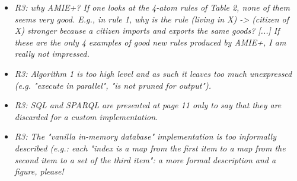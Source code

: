 \begin{figure*}[t!]
\hspace{.1\textwidth}
\begin{minipage}{.8\textwidth}
\large 
     \begin{itemize}
     
      \item \textit{R3: why AMIE+? If one looks at the 4-atom rules of Table 2, none of them seems very good. 
      E.g., in rule 1, why is the rule (living in X) -> (citizen of X) stronger because a citizen imports and exports the same goods? [...] 
      If these are the only 4 examples of good new rules produced by AMIE+,  I am really not impressed.\\  }
      
      
     \item \textit{R3:  Algorithm 1 is too high level and as such it leaves too much unexpressed (e.g. "execute in parallel", "is not pruned for output").\\  }
     
     
      \item \textit{R3:  SQL and SPARQL are presented at page 11 only to say that they are discarded for a custom implementation.\\  }
      
      
      \item \textit{R3:  The "vanilla in-memory database" implementation is too informally described (e.g.: each "index is a map from the first item to a map from the second item to a set of the third item": 
      a more formal description and a figure, please!\\  }
      
      
        \end{itemize}
\end{minipage}
\end{figure*}

